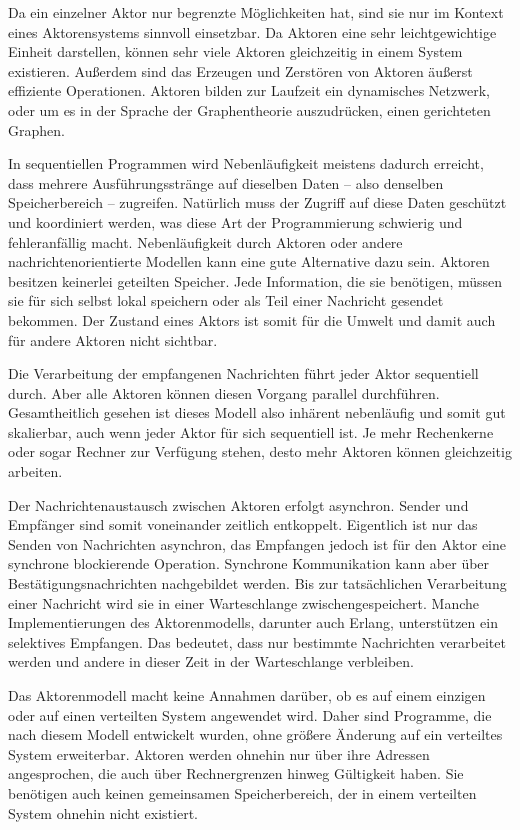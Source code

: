 Da ein einzelner Aktor nur begrenzte Möglichkeiten hat, sind sie nur im Kontext eines Aktorensystems sinnvoll einsetzbar. Da Aktoren eine sehr leichtgewichtige Einheit darstellen, können sehr viele Aktoren gleichzeitig in einem System existieren. Außerdem sind das Erzeugen und Zerstören von Aktoren äußerst effiziente Operationen. Aktoren bilden zur Laufzeit ein dynamisches Netzwerk, oder um es in der Sprache der Graphentheorie auszudrücken, einen gerichteten Graphen.

In sequentiellen Programmen wird Nebenläufigkeit meistens dadurch erreicht, dass mehrere Ausführungsstränge auf dieselben Daten -- also denselben Speicherbereich -- zugreifen. Natürlich muss der Zugriff auf diese Daten geschützt und koordiniert werden, was diese Art der Programmierung schwierig und fehleranfällig macht. Nebenläufigkeit durch Aktoren oder andere nachrichtenorientierte Modellen kann eine gute Alternative dazu sein. Aktoren besitzen keinerlei geteilten Speicher. Jede Information, die sie benötigen, müssen sie für sich selbst lokal speichern oder als Teil einer Nachricht gesendet bekommen. Der Zustand eines Aktors ist somit für die Umwelt und damit auch für andere Aktoren nicht sichtbar.

Die Verarbeitung der empfangenen Nachrichten führt jeder Aktor sequentiell durch. Aber alle Aktoren können diesen Vorgang parallel durchführen. Gesamtheitlich gesehen ist dieses Modell also inhärent nebenläufig und somit gut skalierbar, auch wenn jeder Aktor für sich sequentiell ist. Je mehr Rechenkerne oder sogar Rechner zur Verfügung stehen, desto mehr Aktoren können gleichzeitig arbeiten.

Der Nachrichtenaustausch zwischen Aktoren erfolgt asynchron. Sender und Empfänger sind somit voneinander zeitlich entkoppelt.  Eigentlich ist nur das Senden von Nachrichten asynchron, das Empfangen jedoch ist für den Aktor eine synchrone \bzw blockierende Operation. Synchrone Kommunikation kann aber über Bestätigungsnachrichten nachgebildet werden. Bis zur tatsächlichen Verarbeitung einer Nachricht wird sie in einer Warteschlange zwischengespeichert. Manche Implementierungen des Aktorenmodells, darunter auch Erlang, unterstützen ein selektives Empfangen. Das bedeutet, dass nur bestimmte Nachrichten verarbeitet werden und andere in dieser Zeit in der Warteschlange verbleiben.

Das Aktorenmodell macht keine Annahmen darüber, ob es auf einem einzigen oder auf einen verteilten System angewendet wird. Daher sind Programme, die nach diesem Modell entwickelt wurden, ohne größere Änderung auf ein verteiltes System erweiterbar. Aktoren werden ohnehin nur über ihre Adressen angesprochen, die auch über Rechnergrenzen hinweg Gültigkeit haben. Sie benötigen auch keinen gemeinsamen Speicherbereich, der in einem verteilten System ohnehin nicht existiert.

